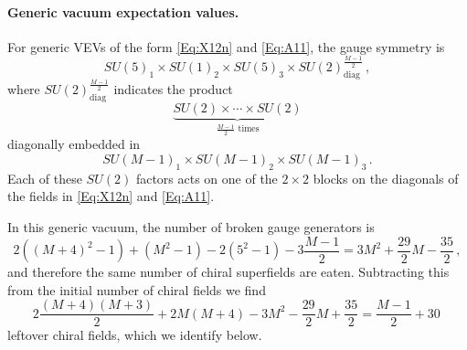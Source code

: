 \documentclass[a4paper,12pt]{article}
\begin{document}
{\paragraph{Generic vacuum expectation values.} 
For generic VEVs of the form \eqref{Eq:X12n} and \eqref{Eq:A11}, the gauge symmetry is 
	\begin{equation}
		SU(5)_1 \times SU(1)_2 \times SU(5)_3 \times SU(2)_\text{diag}^{\frac{M-1}{2}} \, ,
		\label{gauge_symmetry_generic_vevs}
	\end{equation}
	where $SU(2)_\text{diag}^{\frac{M-1}{2}}$ indicates the product
	\begin{equation}
		\underbrace{SU(2) \times \cdots \times SU(2)}_{\frac{M-1}{2} \text{ times}}
	\end{equation}
	diagonally embedded in
	\begin{equation}
		SU(M-1)_1 \times SU(M-1)_2 \times SU(M-1)_3 \, .
	\end{equation}
Each of these $SU(2)$ factors acts on one of the $2\times 2$ blocks on the diagonals of the fields in \eqref{Eq:X12n} and \eqref{Eq:A11}.
	
In this generic vacuum, the number of broken gauge generators is
	\begin{equation}
2 \left((M+4)^2 - 1\right) +  \left(M^2 - 1\right)  - 2 \left(5^2 -1\right) - 3\frac{M-1}{2}= 3M^2 + \frac{29}{2} M - \frac{35}{2}\, ,
\end{equation}
and therefore the same number of chiral superfields are eaten. Subtracting this from the initial number of chiral fields we find
\begin{equation}
2 \frac{(M+4)(M+3)}{2} + 2 M(M+4) - 3M^2 - \frac{29}{2} M + \frac{35}{2} = \frac{M-1}{2} + 30\,  \label{Eq:Counting}
\end{equation}
leftover chiral fields, which we identify below.

}
\end{document}
